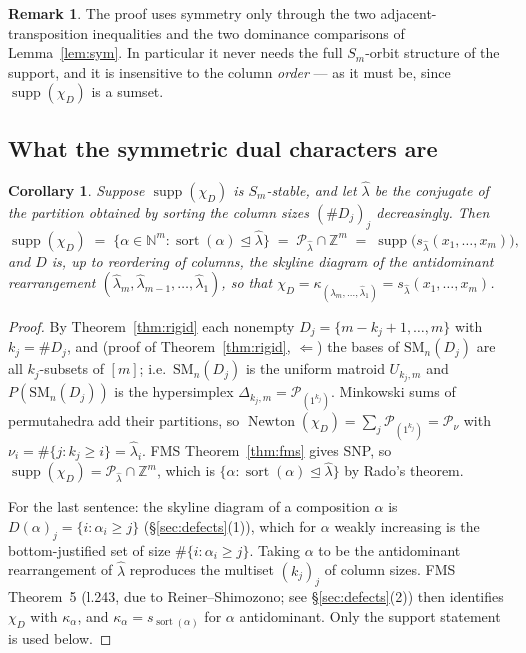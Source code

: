 \documentclass[11pt]{article}
\newtheorem{cor}[thm]{Corollary}
\theoremstyle{definition}
\newtheorem{rem}[thm]{Remark}
\DeclareMathOperator{\supp}{supp}
\DeclareMathOperator{\Newton}{Newton}
\DeclareMathOperator{\sort}{sort}
\newcommand{\Z}{\mathbb{Z}}
\newcommand{\N}{\mathbb{N}}
\newcommand{\SM}{\mathrm{SM}}
\begin{document}
\begin{rem}
The proof uses symmetry only through the two adjacent-transposition inequalities and the two
dominance comparisons of Lemma~\ref{lem:sym}. In particular it never needs the full
$S_m$-orbit structure of the support, and it is insensitive to the column \emph{order} --- as
it must be, since $\supp(\chi_D)$ is a sumset.
\end{rem}

\subsection{What the symmetric dual characters are}

\begin{cor}\label{cor:schur}
Suppose $\supp(\chi_D)$ is $S_m$-stable, and let $\hat\lambda$ be the conjugate of the partition
obtained by sorting the column sizes $(\#D_j)_j$ decreasingly. Then
\[
  \supp(\chi_D)\;=\;\{\alpha\in\N^m:\sort(\alpha)\trianglelefteq\hat\lambda\}
  \;=\;\mathcal{P}_{\hat\lambda}\cap\Z^{m}\;=\;\supp\bigl(s_{\hat\lambda}(x_1,\dots,x_m)\bigr),
\]
and $D$ is, up to reordering of columns, the skyline diagram of the antidominant rearrangement
$(\hat\lambda_m,\hat\lambda_{m-1},\dots,\hat\lambda_1)$, so that
$\chi_D=\kappa_{(\hat\lambda_m,\dots,\hat\lambda_1)}=s_{\hat\lambda}(x_1,\dots,x_m)$.
\end{cor}

\begin{proof}
By Theorem~\ref{thm:rigid} each nonempty $D_j=\{m-k_j+1,\dots,m\}$ with $k_j=\#D_j$, and (proof
of Theorem~\ref{thm:rigid}, $\Leftarrow$) the bases of $\SM_n(D_j)$ are all $k_j$-subsets of
$[m]$; i.e.\ $\SM_n(D_j)$ is the uniform matroid $U_{k_j,m}$ and $P(\SM_n(D_j))$ is the
hypersimplex $\Delta_{k_j,m}=\mathcal{P}_{(1^{k_j})}$. Minkowski sums of permutahedra add their
partitions, so
$\Newton(\chi_D)=\sum_j\mathcal{P}_{(1^{k_j})}=\mathcal{P}_{\nu}$ with
$\nu_i=\#\{j:k_j\ge i\}=\hat\lambda_i$. FMS Theorem~\ref{thm:fms} gives SNP, so
$\supp(\chi_D)=\mathcal{P}_{\hat\lambda}\cap\Z^m$, which is
$\{\alpha:\sort(\alpha)\trianglelefteq\hat\lambda\}$ by Rado's theorem.

For the last sentence: the skyline diagram of a composition $\alpha$ is
$D(\alpha)_j=\{i:\alpha_i\ge j\}$ (\S\ref{sec:defects}(1)), which for $\alpha$ weakly increasing
is the bottom-justified set of size $\#\{i:\alpha_i\ge j\}$. Taking $\alpha$ to be the
antidominant rearrangement of $\hat\lambda$ reproduces the multiset $(k_j)_j$ of column sizes.
FMS Theorem~5 (l.243, due to Reiner--Shimozono; see \S\ref{sec:defects}(2)) then identifies
$\chi_D$ with $\kappa_\alpha$, and $\kappa_\alpha=s_{\sort(\alpha)}$ for $\alpha$ antidominant.
Only the support statement is used below.
\end{proof}
\end{document}
